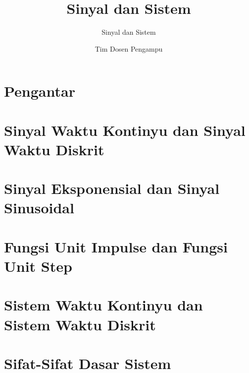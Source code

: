 \documentclass[pdflatex,compress,mathserif]{beamer}
\title{Sinyal dan Sistem}
\subtitle{Sinyal dan Sistem}
\author{Tim Dosen Pengampu}
\begin{document}
\maketitle

\section{Pengantar}

\section{Sinyal Waktu Kontinyu dan Sinyal Waktu Diskrit}

\section{Sinyal Eksponensial dan Sinyal Sinusoidal}

\section{Fungsi Unit Impulse dan Fungsi Unit Step}

\section{Sistem Waktu Kontinyu dan Sistem Waktu Diskrit}

\section{Sifat-Sifat Dasar Sistem}
\end{document}
